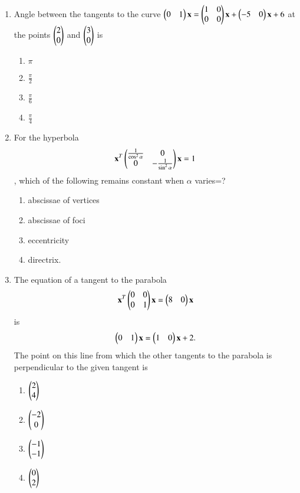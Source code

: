 \begin{enumerate}[label=\arabic*.,ref=\thesubsection.\theenumi]
\begin{enumerate}
    \end{enumerate}
    \item Angle between the tangents to the curve $\begin{pmatrix}0&1\end{pmatrix}\mathbf{x}=\begin{pmatrix}1&0\\0&0\end{pmatrix}\mathbf{x}+\begin{pmatrix}-5&0\end{pmatrix}\mathbf{x}+6$ at the points $\begin{pmatrix}2\\0\end{pmatrix}$ and $\begin{pmatrix}3\\0\end{pmatrix}$ is 
    \begin{enumerate}
    \item $\pi$
    \item $\frac{\pi}{2}$ 
    \item $\frac{\pi}{6}$
    \item $\frac{\pi}{4}$ 
    \end{enumerate}
    \item For the hyperbola
    \begin{align}
    \mathbf{x}^T\begin{pmatrix}\frac{1}{\cos^2\alpha}&0\\0&-\frac{1}{\sin^2\alpha}\end{pmatrix}
    \mathbf{x}=1
    \end{align}, which of the following remains constant when $\alpha$ varies=?
    \begin{enumerate}
    \item abscissae of vertices
    \item abscissae of foci
    \item eccentricity
    \item directrix.
    \end{enumerate}
    \item The equation of a tangent to the parabola
    \begin{align}
    \mathbf{x}^T\begin{pmatrix}0&0\\0&1\end{pmatrix}\mathbf{x}=\begin{pmatrix}8&0\end{pmatrix}\mathbf{x}
    \end{align}is
    \begin{align} \begin{pmatrix}0&1\end{pmatrix}\mathbf{x}=\begin{pmatrix}1&0\end{pmatrix}\mathbf{x}+2.
    \end{align} The point on this line from which the other tangents to the parabola is perpendicular to the given tangent is
    \begin{enumerate}
    \item $\begin{pmatrix}2\\4\end{pmatrix}$
    \item $\begin{pmatrix}-2\\0\end{pmatrix}$ 
    \item $\begin{pmatrix}-1\\-1\end{pmatrix}$
    \item $\begin{pmatrix}0\\2\end{pmatrix}$ 
    \end{enumerate}

\end{enumerate}
